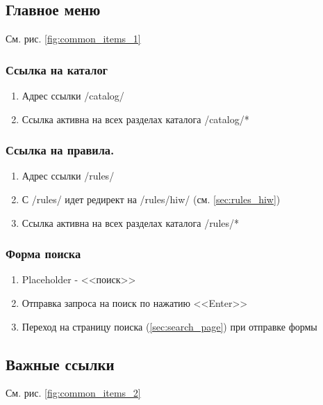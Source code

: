         \subsection{Главное меню}
            См. рис. \ref{fig:common_items_1}

            \label{sec:baseitems_main_meu}
            \subsubsection{Ссылка на каталог}
                \begin{enumerate}
                    \item Адрес ссылки /catalog/
                    \item Ссылка активна на всех разделах каталога /catalog/*
                \end{enumerate}
            \subsubsection{Ссылка на правила.}
                \begin{enumerate}
                    \item Адрес ссылки /rules/
                    \item С /rules/ идет редирект на /rules/hiw/ (см. 
                        \ref{sec:rules_hiw})
                    \item Ссылка активна на всех разделах каталога /rules/*
                \end{enumerate}
            
            \subsubsection{Форма поиска}
                \begin{enumerate}
                    \item Placeholder - <<поиск>>
                    \item Отправка запроса на поиск по нажатию <<Enter>>
                    \item Переход на страницу поиска (\ref{sec:search_page}) 
                        при отправке формы
                \end{enumerate}

       \subsection{Важные ссылки}
            \label{sec:baseitems_important_links}
            См. рис. \ref{fig:common_items_2}

